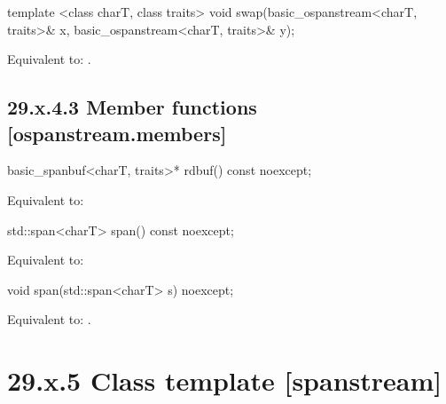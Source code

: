 \documentclass[ebook,11pt,article]{memoir}
\begin{document}
\begin{itemdecl}
template <class charT, class traits>
  void swap(basic_ospanstream<charT, traits>& x,
            basic_ospanstream<charT, traits>& y);
\end{itemdecl}

\begin{itemdescr}
\pnum
\effects Equivalent to: .
\end{itemdescr}

\subsection{29.x.4.3 Member functions [ospanstream.members]}
\label{ospanstream.members}

\begin{itemdecl}
basic_spanbuf<charT, traits>* rdbuf() const noexcept;
\end{itemdecl}

\begin{itemdescr}
\pnum
\effects Equivalent to: \\
\end{itemdescr}

\begin{itemdecl}
std::span<charT> span() const noexcept;
\end{itemdecl}

\begin{itemdescr}
\pnum
\effects Equivalent to: \\
\end{itemdescr}

\begin{itemdecl}
void span(std::span<charT> s) noexcept;
\end{itemdecl}

\begin{itemdescr}
\pnum
\effects
Equivalent to:
.
\end{itemdescr}

\section{29.x.5 Class template  [spanstream] }
\end{document}
